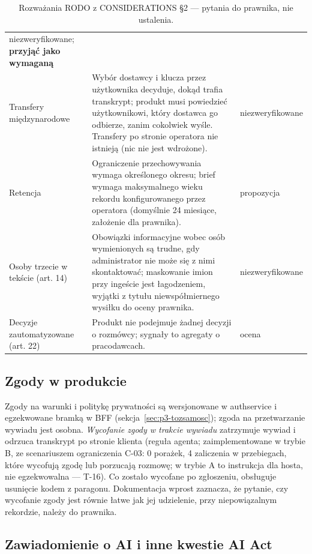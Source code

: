 \begin{table}[htbp]
\begin{tabularx}{\linewidth}{@{}>{\raggedright\arraybackslash}p{3.0cm}>{\raggedright\arraybackslash}X>{\raggedright\arraybackslash}p{2.6cm}@{}}
niezweryfikowane; \textbf{przyjąć jako wymaganą} \\
\addlinespace
Transfery międzynarodowe &
Wybór dostawcy i klucza przez użytkownika decyduje, dokąd trafia transkrypt;
produkt musi powiedzieć użytkownikowi, który dostawca go odbierze, zanim cokolwiek
wyśle. Transfery po stronie operatora nie istnieją (nic nie jest wdrożone). &
niezweryfikowane \\
\addlinespace
Retencja &
Ograniczenie przechowywania wymaga określonego okresu; brief wymaga maksymalnego
wieku rekordu konfigurowanego przez operatora (domyślnie 24 miesiące, założenie dla
prawnika). &
propozycja \\
\addlinespace
Osoby trzecie w tekście (art. 14) &
Obowiązki informacyjne wobec osób wymienionych są trudne, gdy administrator nie może się
z nimi skontaktować; maskowanie imion przy ingeście jest łagodzeniem, wyjątki z tytułu
niewspółmiernego wysiłku do oceny prawnika. &
niezweryfikowane \\
\addlinespace
Decyzje zautomatyzowane (art. 22) &
Produkt nie podejmuje żadnej decyzji o rozmówcy; sygnały to agregaty o pracodawcach. &
ocena \\
\bottomrule
\end{tabularx}
\caption{Rozważania RODO z CONSIDERATIONS §2 --- pytania do prawnika, nie ustalenia.}
\label{tab:p3-rodo}
\end{table}

\subsection{Zgody w produkcie}

Zgody na warunki i politykę prywatności są wersjonowane w authservice i egzekwowane
bramką w BFF (sekcja~\ref{sec:p3-tozsamosc}); zgoda na przetwarzanie wywiadu jest
osobna. \emph{Wycofanie zgody w trakcie wywiadu} zatrzymuje wywiad i odrzuca
transkrypt po stronie klienta (reguła agenta; zaimplementowane w trybie B, ze
scenariuszem ograniczenia C-03: 0 porażek, 4 zaliczenia w przebiegach, które wycofują zgodę
lub porzucają rozmowę; w trybie A to instrukcja dla hosta, nie egzekwowalna --- T-16).
Co zostało wycofane po zgłoszeniu, obsługuje usunięcie kodem z paragonu. Dokumentacja
wprost zaznacza, że pytanie, czy wycofanie zgody jest równie łatwe jak jej
udzielenie, przy niepowiązalnym rekordzie, należy do prawnika.

\subsection{Zawiadomienie o AI i inne kwestie AI Act}

